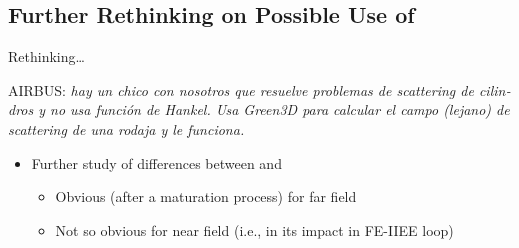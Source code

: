 \subsection{Further Rethinking on Possible Use of  {\GreenT}}

    
  \begin{frame}[plain]
    \centering    \Large{Rethinking\ldots}

    \vspace*{0.5\baselineskip}

    \centering\parbox{\textwidth}{%
      AIRBUS: \emph{\foreignlanguage{spanish}{hay un chico con nosotros que
          resuelve problemas de scattering de cilindros y no usa
          función de Hankel. Usa Green3D para calcular el campo
          (lejano) de scattering de una rodaja y \alert{le funciona.}}
        }}

      \vspace*{\baselineskip}
      
      \begin{itemize}
      \item Further study of differences between  {\GreenD} and {\GreenT}
        \begin{itemize}
        \item Obvious (after a maturation process) for far field
        \item Not so obvious for near field (i.e., in its impact in
          FE-IIEE loop)
        \end{itemize}
      \end{itemize}
      
  \end{frame}
  


